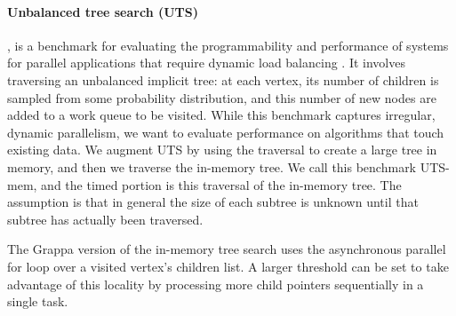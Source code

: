 \paragraph{Unbalanced tree search (UTS)}, is a benchmark for evaluating the programmability and performance of systems for parallel applications that require dynamic load balancing \cite{Olivier:uts2006}. It involves traversing an unbalanced implicit tree: at each vertex, its number of children is sampled from some probability distribution, and this number of new nodes are added to a work queue to be visited. While this benchmark captures irregular, dynamic parallelism, we want to evaluate performance on algorithms that touch existing data. We augment UTS by using the traversal to create a large tree in memory, and then we traverse the in-memory tree. We call this benchmark UTS-mem, and the timed portion is this traversal of the in-memory tree. The assumption is that in general the size of each subtree is unknown until that subtree has actually been traversed.


The Grappa version of the in-memory tree search uses the asynchronous parallel for loop over a visited vertex's children list. A larger threshold can be set to take advantage of this locality by processing more child pointers sequentially in a single task.



